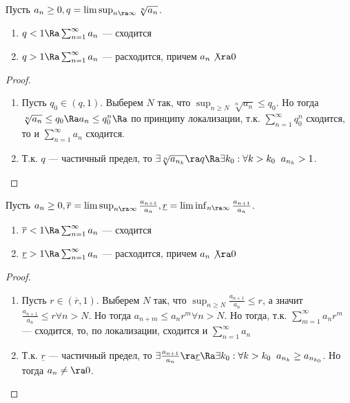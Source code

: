 \begin{theorem}
    Пусть \(a_n \ge 0, q = \limsup_{n \ra \infty}\sqrt[n]{a_n}\).
    \begin{enumerate}
        \item \(q < 1 \Ra \sum_{n = 1}^\infty a_n\) --- сходится
        \item \(q > 1 \Ra \sum_{n = 1}^\infty a_n\) --- расходится, причем \(a_n \not\ra 0\)
    \end{enumerate}
\end{theorem}
\begin{proof}\indent
    \begin{enumerate}
        \item Пусть \(q_0 \in (q, 1)\). Выберем \(N\) так, что \(\sup_{n \ge N}\sqrt[n]{a_n} \le q_0\). Но тогда \(\sqrt[n]{a_n} \le q_0 \Ra a_n \le q_0^n \Ra\) по принципу локализации, т.к. \(\sum_{n = 1}^\infty q_0^n\) сходится, то и \(\sum_{n = 1}^\infty a_n\) сходится.
        \item Т.к. \(q\) --- частичный предел, то \(\exists \sqrt[n]{a_{n_k}} \ra q \Ra \exists k_0: \forall k > k_0\;\;a_{n_k} > 1\).
    \end{enumerate}
\end{proof}

\begin{theorem}
    Пусть \(a_n \ge 0, \overline{r} = \limsup_{n \ra \infty}\frac{a_{n + 1}}{a_n}, \underline{r} = \liminf_{n \ra \infty}\frac{a_{n + 1}}{a_n}\).
    \begin{enumerate}
        \item \(\overline{r} < 1 \Ra \sum_{n = 1}^\infty a_n\) --- сходится
        \item \(\underline{r} > 1 \Ra \sum_{n = 1}^\infty a_n\) --- расходится, причем \(a_n \not\ra 0\)
    \end{enumerate}
\end{theorem}
\begin{proof}\indent
    \begin{enumerate}
        \item Пусть \(r \in (\overline{r}, 1)\). Выберем \(N\) так, что \(\sup_{n \ge N}\frac{a_{n + 1}}{a_n} \le r\), а значит \(\frac{a_{n + 1}}{a_n} \le r \forall n > N\). Но тогда \(a_{n + m} \le a_nr^m \forall n > N\). Но тогда, т.к. \(\sum_{m = 1}^\infty a_nr^m\) --- сходится, то, по локализации, сходится и \(\sum_{n = 1}^\infty a_n\)
        \item Т.к. \(\underline{r}\) --- частичный предел, то \(\exists \frac{a_{n + 1}}{a_n} \ra \underline{r} \Ra \exists k_0: \forall k > k_0\;\;a_{n_k} \ge a_{n_{k_0}}\). Но тогда \(a_n \ne\ra 0\).
    \end{enumerate}
\end{proof}

